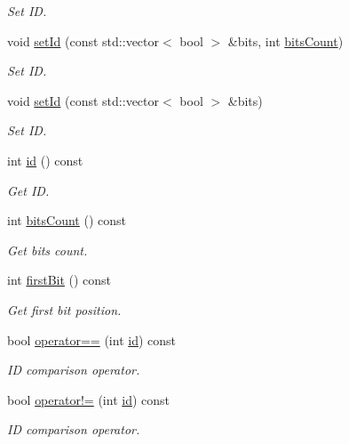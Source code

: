 \begin{DoxyCompactItemize}
\begin{DoxyCompactList}\small\item\em Set I\-D. \end{DoxyCompactList}\item 
void \hyperlink{classmdt_modbus_hw_node_id_a3d72171b29dfa90c63012b04f79fa22e}{set\-Id} (const std\-::vector$<$ bool $>$ \&bits, int \hyperlink{classmdt_modbus_hw_node_id_a501337cd2626d50ce214ec52ef07c3ac}{bits\-Count})
\begin{DoxyCompactList}\small\item\em Set I\-D. \end{DoxyCompactList}\item 
void \hyperlink{classmdt_modbus_hw_node_id_a0960e1459aafaaafcaa2240386874d9d}{set\-Id} (const std\-::vector$<$ bool $>$ \&bits)
\begin{DoxyCompactList}\small\item\em Set I\-D. \end{DoxyCompactList}\item 
int \hyperlink{classmdt_modbus_hw_node_id_a3daa8c9f772b3e97858d0d82eca31115}{id} () const 
\begin{DoxyCompactList}\small\item\em Get I\-D. \end{DoxyCompactList}\item 
int \hyperlink{classmdt_modbus_hw_node_id_a501337cd2626d50ce214ec52ef07c3ac}{bits\-Count} () const 
\begin{DoxyCompactList}\small\item\em Get bits count. \end{DoxyCompactList}\item 
int \hyperlink{classmdt_modbus_hw_node_id_aec9a6b9536d1584888f160b118986412}{first\-Bit} () const 
\begin{DoxyCompactList}\small\item\em Get first bit position. \end{DoxyCompactList}\item 
bool \hyperlink{classmdt_modbus_hw_node_id_a1a9562ed155869af218971d999a99a03}{operator==} (int \hyperlink{classmdt_modbus_hw_node_id_a3daa8c9f772b3e97858d0d82eca31115}{id}) const 
\begin{DoxyCompactList}\small\item\em I\-D comparison operator. \end{DoxyCompactList}\item 
bool \hyperlink{classmdt_modbus_hw_node_id_a2d37e737409bafa3a0eac89f3fbc6139}{operator!=} (int \hyperlink{classmdt_modbus_hw_node_id_a3daa8c9f772b3e97858d0d82eca31115}{id}) const 
\begin{DoxyCompactList}\small\item\em I\-D comparison operator. \end{DoxyCompactList}\end{DoxyCompactItemize}



